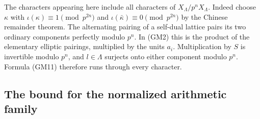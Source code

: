 The characters appearing here include all characters of
$X_\Lambda/p^nX_\Lambda$.  Indeed choose $\kappa$ with
$\iota(\kappa)\equiv1\pmod{p^{2n}}$ and
$\iota(\bar\kappa)\equiv0\pmod{p^{2n}}$ by the Chinese
remainder theorem.  The alternating pairing of a self-dual
lattice pairs its two ordinary components perfectly modulo
$p^n$.  In (GM2) this is the product of the elementary elliptic
pairings, multiplied by the units $a_i$.  Multiplication by
$S$ is invertible modulo $p^n$, and $l\in\Lambda$ surjects
onto either component modulo $p^n$.  Formula (GM11) therefore
runs through every character.

\subsection{The bound for the normalized arithmetic family}


